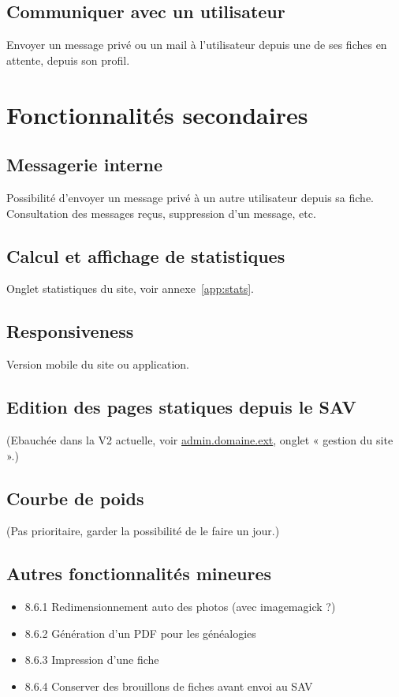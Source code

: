 \documentclass[a4paper,10pt]{article}
\begin{document}
\subsection{Communiquer avec un utilisateur}
Envoyer un message privé ou un mail à l'utilisateur depuis une de ses fiches en attente, depuis son profil.


\section{Fonctionnalités secondaires}
\subsection{Messagerie interne}
Possibilité d'envoyer un message privé à un autre utilisateur depuis sa fiche. Consultation des messages reçus, suppression d'un message, etc.

\subsection{Calcul et affichage de statistiques}
Onglet statistiques du site, voir annexe~\ref{app:stats}.

\subsection{Responsiveness}
Version mobile du site ou application.

\subsection{Edition des pages statiques depuis le SAV}
(Ebauchée dans la V2 actuelle, voir \url{admin.domaine.ext}, onglet « gestion du site ».)

\subsection{Courbe de poids}
(Pas prioritaire, garder la possibilité de le faire un jour.)

\subsection{Autres fonctionnalités mineures}
\begin{itemize}
\item 8.6.1 Redimensionnement auto des photos (avec imagemagick ?)
\item 8.6.2 Génération d'un PDF pour les généalogies
\item 8.6.3 Impression d'une fiche
\item 8.6.4 Conserver des brouillons de fiches avant envoi au SAV
\end{itemize}
\end{document}
